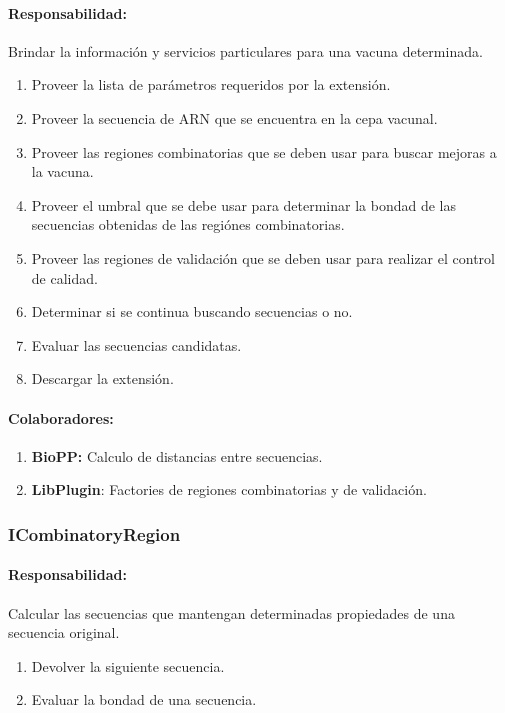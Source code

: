     \paragraph{Responsabilidad:} Brindar la informaci\'on y servicios
particulares para una vacuna determinada.    
      \begin{enumerate}
       \item Proveer la lista de par\'ametros requeridos por la extensi\'on.
       \item Proveer la secuencia de ARN que se encuentra en la cepa vacunal.
       \item Proveer las regiones combinatorias que se deben usar para buscar
mejoras a la vacuna.
       \item Proveer el umbral que se debe usar para determinar la bondad de las
secuencias obtenidas de las regi\'ones combinatorias.
       \item Proveer las regiones de validaci\'on que se deben usar para
realizar el control de calidad.
       \item Determinar si se continua buscando secuencias o no.
       \item Evaluar las secuencias candidatas.
       \item Descargar la extensi\'on.
      \end{enumerate}
    \paragraph{Colaboradores:}
      \begin{enumerate}
       \item \textbf{BioPP:} Calculo de distancias entre secuencias.
       \item \textbf{LibPlugin}: Factories de regiones combinatorias y de
validaci\'on.
      \end{enumerate}

  \subsubsection{ICombinatoryRegion}
    \paragraph{Responsabilidad:} Calcular las secuencias que mantengan
determinadas propiedades de una secuencia original.    
      \begin{enumerate}
       \item Devolver la siguiente secuencia.
       \item Evaluar la bondad de una secuencia.
      \end{enumerate}
